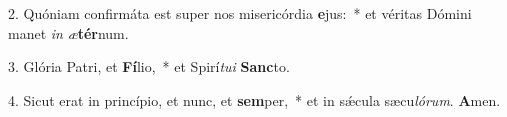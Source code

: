 2. Quóniam confirmáta est super nos misericórdia \textbf{e}jus:~*  et véritas Dómini manet \textit{in} \textit{æ}\textbf{tér}num.\

3. Glória Patri, et \textbf{Fí}lio,~*  et Spirí\textit{tu}\textit{i} \textbf{Sanc}to.\

4. Sicut erat in princípio, et nunc, et \textbf{sem}per,~*  et in sǽcula sæcu\textit{ló}\textit{rum}. \textbf{A}men.\


